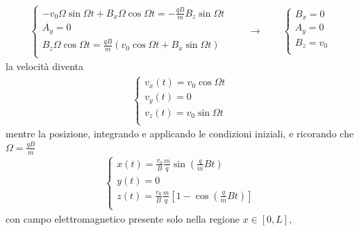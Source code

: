 \documentclass[letterpaper,10pt,italian]{jupyterBook}
\begin{document}
\begin{equation*}
\begin{split}\begin{cases}
  - v_0 \Omega \sin \Omega t + B_x \Omega \cos \Omega t = - \frac{q B}{m} B_z \sin \Omega t \\
  A_y = 0 \\
  B_z \Omega \cos \Omega t = \frac{q B}{m} \left( v_0 \cos \Omega t +  B_x \sin \Omega t \right) \\
\end{cases}
\qquad \rightarrow \qquad
\begin{cases}
  B_x = 0  \\
  A_y = 0 \\
  B_z = v_0 \\
\end{cases}\end{split}
\end{equation*}
\sphinxAtStartPar
la velocità diventa
\begin{equation*}
\begin{split}\begin{cases}
v_x(t) = v_0 \cos \Omega t  \\
v_y(t) = 0 \\
v_z(t) = v_0 \sin \Omega t \\
\end{cases}\end{split}
\end{equation*}
\sphinxAtStartPar
mentre la posizione, integrando e applicando le condizioni iniziali, e ricorando che \(\Omega = \frac{q B}{m}\)
\begin{equation*}
\begin{split}\begin{cases}
  x(t) = \frac{v_0}{B} \frac{m}{q} \sin \left( \frac{q}{m} B t \right)  \\
  y(t) = 0 \\
  z(t) = \frac{v_0}{B} \frac{m}{q} \left[ 1 - \cos \left( \frac{q}{m} B t \right) \right] \\
\end{cases}\end{split}
\end{equation*}
\sphinxAtStartPar
{} con campo elettromagnetico presente solo nella regione \(x \in [0, L]\),
\end{document}
